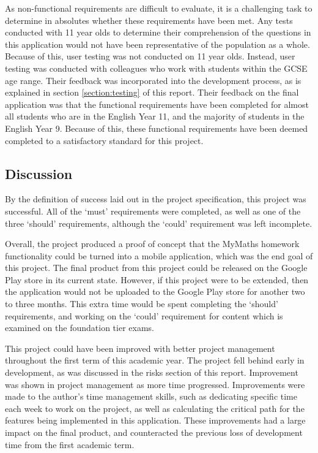 \documentclass{article}
\begin{document}
As non-functional requirements are difficult to evaluate, it is a challenging task to determine in absolutes whether these requirements have been met. Any tests conducted with 11 year olds to determine their comprehension of the questions in this application would not have been representative of the population as a whole. Because of this, user testing was not conducted on 11 year olds. Instead, user testing was conducted with colleagues who work with students within the GCSE age range. Their feedback was incorporated into the development process, as is explained in section \ref{section:testing} of this report. Their feedback on the final application was that the functional requirements have been completed for almost all students who are in the English Year 11, and the majority of students in the English Year 9. Because of this, these functional requirements have been deemed completed to a satisfactory standard for this project. \par

\subsection{Discussion}

By the definition of success laid out in the project specification, this project was successful. All of the `must' requirements were completed, as well as one of the three `should' requirements, although the `could' requirement was left incomplete. \par

Overall, the project produced a proof of concept that the MyMaths homework functionality could be turned into a mobile application, which was the end goal of this project. The final product from this project could be released on the Google Play store in its current state. However, if this project were to be extended, then the application would not be uploaded to the Google Play store for another two to three months. This extra time would be spent completing the `should' requirements, and working on the `could' requirement for content which is examined on the foundation tier exams. \par

This project could have been improved with better project management throughout the first term of this academic year. The project fell behind early in development, as was discussed in the risks section of this report. Improvement was shown in project management as more time progressed. Improvements were made to the author's time management skills, such as dedicating specific time each week to work on the project, as well as calculating the critical path for the features being implemented in this application. These improvements had a large impact on the final product, and counteracted the previous loss of development time from the first academic term. \par
\end{document}
